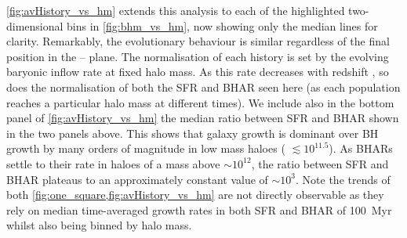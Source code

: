 \cref{fig:avHistory_vs_hm} extends this analysis to each of the highlighted
two-dimensional bins in \cref{fig:bhm_vs_hm}, now showing only the median lines
for clarity. Remarkably, the evolutionary behaviour is similar regardless of
the final position in the -- plane.  The normalisation of each
history is set by the evolving baryonic inflow rate at fixed halo mass. As this
rate decreases with redshift \citep[e.g,][]{Correa2015}, so does the
normalisation of both the SFR and BHAR seen here (as each population reaches a
particular halo mass at different times). We include also in the bottom panel
of \cref{fig:avHistory_vs_hm} the median ratio between SFR and BHAR shown in
the two panels above. This shows that galaxy growth is dominant over BH growth
by many orders of magnitude in low mass haloes ( $\lesssim
10^{11.5}$\Msol). As BHARs settle to their  rate in haloes of a
mass above  $\sim 10^{12}$, the ratio between SFR and BHAR plateaus to
an approximately constant value of $\sim 10^{3}$.  Note the trends of both
\cref{fig:one_square,fig:avHistory_vs_hm} are not directly observable as they
rely on median time-averaged growth rates in both SFR and BHAR of 100~Myr
whilst also being binned by halo mass. 
